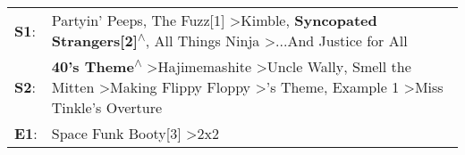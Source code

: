 \begin{supertabular}{p{0.03\textwidth}p{0.92\textwidth}}
 \textbf{S1}:  &                                                                                                                   Partyin' Peeps\textsuperscript{}, \enspace The Fuzz[1]\textsuperscript{} \textgreater \enspace Kimble\textsuperscript{}, \enspace \textbf{Syncopated Strangers[2]\textsuperscript{$\wedge$}}, \enspace All Things Ninja\textsuperscript{} \textgreater \enspace ...And Justice for All\textsuperscript{}  \enspace  \\
 \textbf{S2}:  &  \textbf{40's Theme\textsuperscript{$\wedge$}} \textgreater \enspace Hajimemashite\textsuperscript{} \textgreater \enspace Uncle Wally\textsuperscript{}, \enspace Smell the Mitten\textsuperscript{} \textgreater \enspace Making Flippy Floppy\textsuperscript{} \textgreater {}'s Theme\textsuperscript{}, \enspace Example 1\textsuperscript{} \textgreater \enspace Miss Tinkle's Overture\textsuperscript{}  \enspace  \\
 \textbf{E1}:  &                                                                                                                                                                                                                                                                                                                                          Space Funk Booty[3]\textsuperscript{} \textgreater \enspace 2x2\textsuperscript{}  \enspace  \\
\end{supertabular}
